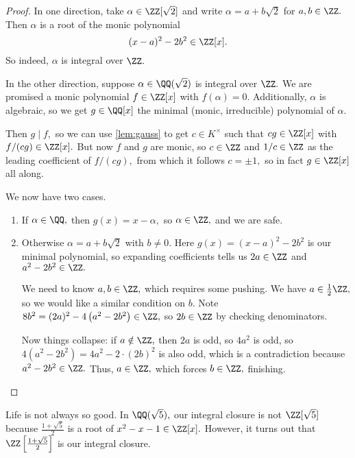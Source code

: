 \begin{proof}
    In one direction, take $\alpha\in\ZZ[\sqrt2]$ and write $\alpha=a+b\sqrt2$ for $a,b\in\ZZ.$ Then $\alpha$ is a root of the monic polynomial
    \[(x-a)^2-2b^2\in\ZZ[x].\]
    So indeed, $\alpha$ is integral over $\ZZ.$
    
    In the other direction, suppose $\alpha\in\QQ(\sqrt2)$ is integral over $\ZZ.$ We are promised a monic polynomial $f\in\ZZ[x]$ with $f(\alpha)=0.$ Additionally, $\alpha$ is algebraic, so we get $g\in\QQ[x]$ the minimal (monic, irreducible) polynomial of $\alpha.$
    
    Then $g\mid f,$ so we can use \autoref{lem:gauss} to get $c\in K^\times$ such that $cg\in\ZZ[x]$ with $f/(cg)\in\ZZ[x].$ But now $f$ and $g$ are monic, so $c\in\ZZ$ and $1/c\in\ZZ$ as the leading coefficient of $f/(cg),$ from which it follows $c=\pm1,$ so in fact $g\in\ZZ[x]$ all along.
    
    We now have two cases.
    \begin{enumerate}
        \item If $\alpha\in\QQ,$ then $g(x)=x-\alpha,$ so $\alpha\in\ZZ,$ and we are safe.
        \item Otherwise $\alpha=a+b\sqrt2$ with $b\ne0.$ Here $g(x)=(x-a)^2-2b^2$ is our minimal polynomial, so expanding coefficients tells us $2a\in\ZZ$ and $a^2-2b^2\in\ZZ.$
        
        We need to know $a,b\in\ZZ,$ which requires some pushing. We have $a\in\frac12\ZZ,$ so we would like a similar condition on $b.$ Note $8b^2=(2a)^2-4\left(a^2-2b^2\right)\in\ZZ,$ so $2b\in\ZZ$ by checking denominators.
        
        Now things collapse: if $a\notin\ZZ,$ then $2a$ is odd, so $4a^2$ is odd, so $4\left(a^2-2b^2\right)=4a^2-2\cdot(2b)^2$ is also odd, which is a contradiction because $a^2-2b^2\in\ZZ.$ Thus, $a\in\ZZ,$ which forces $b\in\ZZ,$ finishing.
        \qedhere
    \end{enumerate}
\end{proof}
\begin{remark}
    Life is not always so good. In $\QQ(\sqrt5),$ our integral closure is not $\ZZ[\sqrt5]$ because $\frac{1+\sqrt5}2$ is a root of $x^2-x-1\in\ZZ[x].$ However, it turns out that $\ZZ\left[\frac{1+\sqrt5}2\right]$ is our integral closure.
\end{remark}

